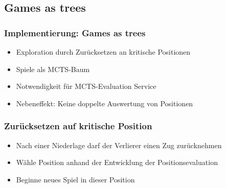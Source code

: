 \subsection{Games as trees}



\begin{frame}
 \frametitle{Implementierung: Games as trees}
  


\begin{itemize}
  \item \pause Exploration durch Zurücksetzen an kritische Positionen
  \item \pause Spiele als MCTS-Baum
  \item \pause Notwendigkeit für MCTS-Evaluation Service
  \item \pause Nebeneffekt: Keine doppelte Auswertung von Positionen
\end{itemize}


  
\end{frame}
\begin{frame}
 \frametitle{Zurücksetzen auf kritische Position}
  


\begin{itemize}
  \item \pause Nach einer Niederlage darf der Verlierer einen Zug zurücknehmen
  \item \pause Wähle Position anhand der Entwicklung der Positionsevaluation
  \item \pause Beginne neues Spiel in dieser Position
\end{itemize}

  
\end{frame}
